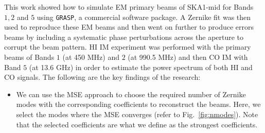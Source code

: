 This work showed how to simulate EM primary beams of SKA1-mid for Bands $1,2$ and $5$ using {\tt GRASP}, a commercial software package. A Zernike fit was then
used to reproduce these EM beams and then went on further to produce errors beams by including a systematic phase perturbations across the aperture 
to corrupt the beam pattern. HI IM experiment was performed with the primary beams of Bands $1$ (at 450 MHz) and $2$ (at 990.5 MHz) and then CO IM with Band $5$ (at 13.6 GHz) 
in order to estimate the power spectrum of both HI and CO signals. The following are the key findings of the research:
\begin{itemize}
 \item We can use the MSE approach to choose the required number of Zernike modes with the corresponding coefficients to reconstruct the beams. Here,
       we select the modes where the MSE converges (refer to Fig.~\ref{fig:nmodes}). Note that the selected coefficients are what we define as the strongest coefficients.
      

\end{itemize}
